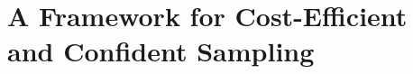 \documentclass[11pt]{NSFamsart}
\newcommand{\reals}{{\mathbb{R}}}
\newcommand{\bt}{{\boldsymbol{t}}}
\newcommand{\bX}{{\boldsymbol{X}}}
\def\dif{\textup{d}}
\newcommand{\norm}[2][{}]{\ensuremath{\left \lVert #2 \right \rVert}_{#1}}
\newcommand{\Order}{\mathcal{O}}
\begin{document}






\section{A Framework for Cost-Efficient and Confident Sampling}
\end{document}
